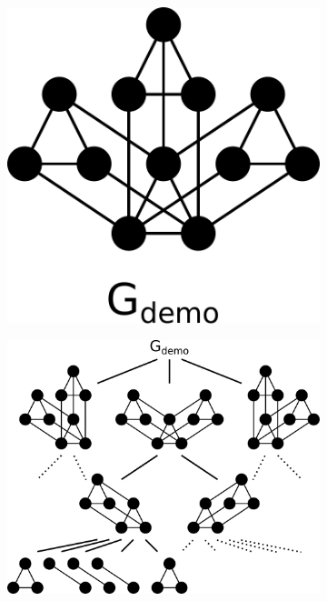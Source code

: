 \ClearMyMinHeight
{}

\begin{figure}\centering%

  \begin{subfigure}{0.4\linewidth}\centering
    \includegraphics[height=\myMinHeight]{../../img/svg/3xc2c3_new}
    \caption{}\label{fig:demo_graph:graph}
  \end{subfigure}%
  \hfill
  \begin{subfigure}{0.3\linewidth}\centering
    \includegraphics[height=\myMinHeight]{../../img/svg/3xc2c3_new_comdrp}

\end{subfigure}
\end{figure}

